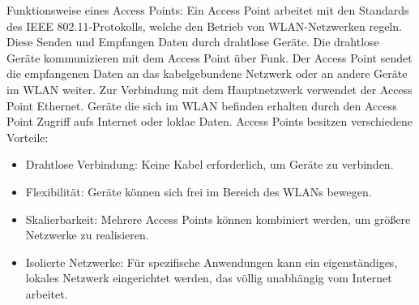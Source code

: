 Funktionsweise eines Access Points:
\newline 
\newline 
Ein Access Point arbeitet mit den Standards des IEEE 802.11-Protokolls, welche den Betrieb von WLAN-Netzwerken regeln.
\newline 
Diese Senden und Empfangen Daten durch drahtlose Geräte. Die drahtlose Geräte kommunizieren mit dem Access Point über Funk. Der Access Point sendet die empfangenen Daten an das kabelgebundene Netzwerk oder an andere Geräte im WLAN weiter. 
\newline 
Zur Verbindung mit dem Hauptnetzwerk verwendet der Access Point Ethernet. Geräte die sich im WLAN befinden erhalten durch den Access Point Zugriff aufs Internet oder loklae Daten. 
\newline 
Access Points besitzen verschiedene Vorteile:
\begin{itemize}
    \item Drahtlose Verbindung: Keine Kabel erforderlich, um Geräte zu verbinden.
    \item Flexibilität: Geräte können sich frei im Bereich des WLANs bewegen.
    \item Skalierbarkeit: Mehrere Access Points können kombiniert werden, um größere Netzwerke zu realisieren.
    \item Isolierte Netzwerke: Für spezifische Anwendungen kann ein eigenständiges, lokales Netzwerk eingerichtet werden, das völlig unabhängig vom Internet arbeitet. 
\end{itemize}
\newpage

 
 
